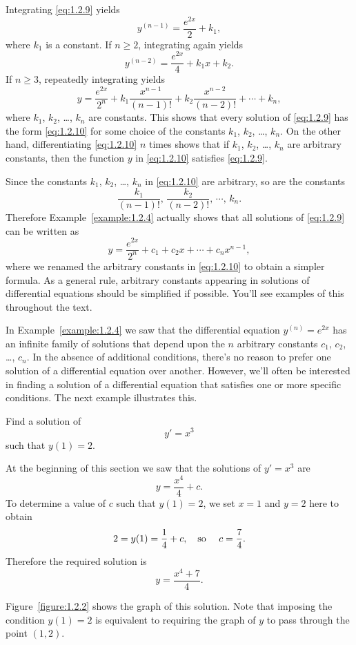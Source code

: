 \begin{examplesolution}
\solution Integrating \eqref{eq:1.2.9} yields
\[
  y^{(n-1)}=\frac{e^{2x}}{2}+k_{1},
\]
where $k_{1}$ is a constant. If $n\ge2$, integrating again yields
\[
  y^{(n-2)}=\frac{e^{2x}}{4}+k_{1}x+k_{2}.
\]
If $n\ge3$, repeatedly integrating yields
\begin{equation}
  \label{eq:1.2.10}y=\frac{e^{2x}}{2^{n}}+k_{1}\frac{x^{n-1}}{(n-1)!}+k_{2}\frac{x^{n-2}}{(n-2)!}+\cdots+k_{n},
\end{equation}
where $k_{1}$, $k_{2}$, \dots, $k_{n}$ are constants. This shows that every solution of
\eqref{eq:1.2.9} has the form \eqref{eq:1.2.10} for some choice of the constants $k_{1}$, $k_{2}$,
\dots, $k_{n}$. On the other hand, differentiating \eqref{eq:1.2.10} $n$ times shows that if
$k_{1}$, $k_{2}$, \dots, $k_{n}$ are arbitrary constants, then the function $y$ in \eqref{eq:1.2.10}
satisfies \eqref{eq:1.2.9}.

Since the constants $k_{1}$, $k_{2}$, \dots, $k_{n}$ in \eqref{eq:1.2.10} are arbitrary, so are the
constants
\[
  \frac{k_{1}}{(n-1)!},\,\frac{k_{2}}{(n-2)!},\,\cdots,\,k_{n}.
\]
Therefore Example~\ref{example:1.2.4} actually shows that all solutions of \eqref{eq:1.2.9} can be
written as
\[
  y=\frac{e^{2x}}{2^{n}}+c_{1}+c_{2}x+\cdots+c_{n}x^{n-1},
\]
where we renamed the arbitrary constants in \eqref{eq:1.2.10} to obtain a simpler formula. As a
general rule, arbitrary constants appearing in solutions of differential equations should be
simplified if possible. You'll see examples of this throughout the text.
\end{examplesolution}


\noindent
In Example~\ref{example:1.2.4} we saw that the differential equation $y^{(n)}=e^{2x}$ has an
infinite family of solutions that depend upon the $n$ arbitrary constants $c_{1}$, $c_{2}$, \dots,
$c_{n}$. In the absence of additional conditions, there's no reason to prefer one solution of a
differential equation over another. However, we'll often be interested in finding a solution of a
differential equation that satisfies one or more specific conditions. The next example illustrates
this.

\begin{example}
  \label{example:1.2.5} \rm Find a solution of
  \[
    y'=x^{3}
  \]
  such that $y(1)=2$.
\end{example}

\begin{examplesolution}
\solution At the beginning of this section we saw that the solutions of $y'=x^{3}$ are
\[
  y=\frac{x^{4}}{4}+c.
\]
To determine a value of $c$ such that $y(1)=2$, we set $x=1$ and $y=2$ here to obtain
\[
  2=y(1)=\frac{1}{4}+c,\mbox{\quad so \quad}c=\frac{7}{4}.
\]
Therefore the required solution is
\[
  y=\frac{x^{4}+7}{4}.
\]

Figure~\ref{figure:1.2.2} shows the graph of this solution. Note that imposing the condition
$y(1)=2$ is equivalent to requiring the graph of $y$ to pass through the point $(1,2)$.
\end{examplesolution}

